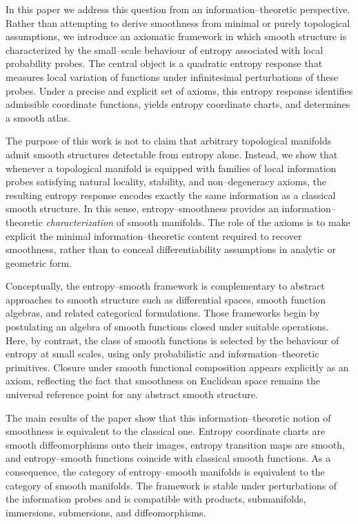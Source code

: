 \documentclass[11pt]{amsart}
\theoremstyle{definition}
\theoremstyle{remark}
\begin{document}
In this paper we address this question from an information--theoretic perspective. Rather than attempting
to derive smoothness from minimal or purely topological assumptions, we introduce an axiomatic framework
in which smooth structure is characterized by the small--scale behaviour of entropy associated with local
probability probes. The central object is a quadratic entropy response that measures local variation of
functions under infinitesimal perturbations of these probes. Under a precise and explicit set of axioms,
this entropy response identifies admissible coordinate functions, yields entropy coordinate charts, and
determines a smooth atlas.

The purpose of this work is not to claim that arbitrary topological manifolds admit smooth structures
detectable from entropy alone. Instead, we show that whenever a topological manifold is equipped with
families of local information probes satisfying natural locality, stability, and non--degeneracy axioms,
the resulting entropy response encodes exactly the same information as a classical smooth structure.
In this sense, entropy--smoothness provides an information--theoretic \emph{characterization} of smooth
manifolds. The role of the axioms is to make explicit the minimal information--theoretic content required
to recover smoothness, rather than to conceal differentiability assumptions in analytic or geometric form.

Conceptually, the entropy--smooth framework is complementary to abstract approaches to smooth structure
such as differential spaces, smooth function algebras, and related categorical formulations. Those
frameworks begin by postulating an algebra of smooth functions closed under suitable operations. Here,
by contrast, the class of smooth functions is selected by the behaviour of entropy at small scales,
using only probabilistic and information--theoretic primitives. Closure under smooth functional
composition appears explicitly as an axiom, reflecting the fact that smoothness on Euclidean space
remains the universal reference point for any abstract smooth structure.

The main results of the paper show that this information--theoretic notion of smoothness is equivalent
to the classical one. Entropy coordinate charts are smooth diffeomorphisms onto their images, entropy
transition maps are smooth, and entropy--smooth functions coincide with classical smooth functions.
As a consequence, the category of entropy--smooth manifolds is equivalent to the category of smooth
manifolds. The framework is stable under perturbations of the information probes and is compatible
with products, submanifolds, immersions, submersions, and diffeomorphisms.
\end{document}
